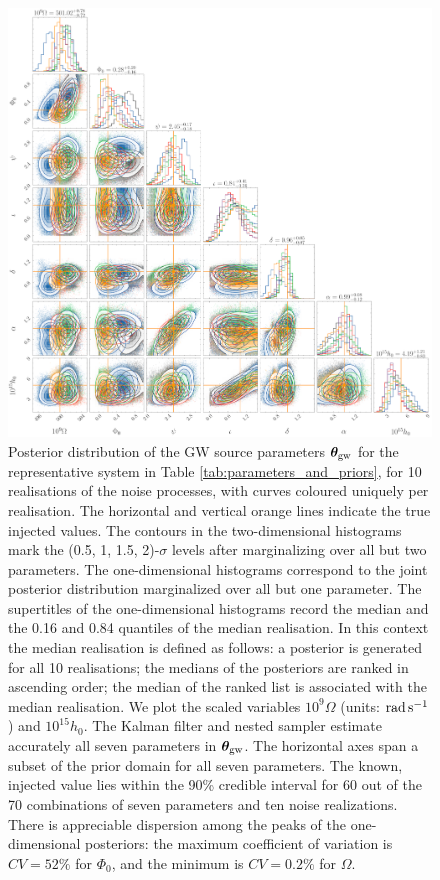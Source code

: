 \documentclass[fleqn,usenatbib,useAMS]{mnras}
\begin{document}
\begin{figure}
	\includegraphics[width=\textwidth, height =\textwidth ]{images/corner_lowSNR_n4000}
	\caption[Caption of LOF]{Posterior distribution of the GW source parameters $\boldsymbol{\theta}_{\rm gw}$ for the representative system in Table \ref{tab:parameters_and_priors}, for 10 realisations of the noise processes, with curves coloured uniquely per realisation. The horizontal and vertical orange lines indicate the true injected values. The contours in the two-dimensional histograms mark the (0.5, 1, 1.5, 2)-$\sigma$ levels after marginalizing over all but two parameters. The one-dimensional histograms correspond to the joint posterior distribution marginalized over all but one parameter. The supertitles of the one-dimensional histograms record the median and the 0.16 and 0.84 quantiles of the median realisation. In this context the median realisation is defined as follows: a posterior is generated for all 10 realisations; the medians of the posteriors are ranked in ascending order; the median of the ranked list is associated with the median realisation. We plot the scaled variables $10^9 \Omega$ (units: ${\rm rad \, s^{-1}}$) and $10^{15} h_0$. The Kalman filter and nested sampler estimate accurately all seven parameters in ${\boldsymbol{\theta}}_{\rm gw}$. The horizontal axes span a subset of the prior domain for all seven parameters. The known, injected value lies within the 90\% credible interval for 60 out of the 70 combinations of seven parameters and ten noise realizations. There is appreciable dispersion among the peaks of the one-dimensional posteriors: the maximum coefficient of variation is $CV = 52 \%$ for $\Phi_0$, and the minimum is $CV = 0.2 \%$ for $\Omega$.}
	\label{fig:corner_plot_1}
\end{figure}
\end{document}
